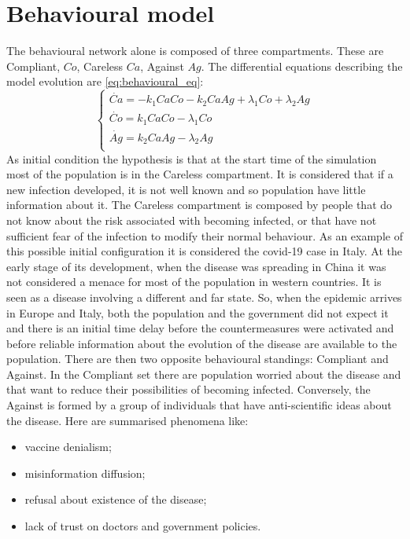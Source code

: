 \section{Behavioural model}
The behavioural network alone is composed of three compartments.
These are Compliant, $Co$, Careless $Ca$, Against $Ag$. 
The differential equations describing the model evolution are \ref{eq:behavioural_eq}: 
\begin{equation}
	\begin{cases}
		\dot{Ca} = -k_1 Ca Co - k_2 Ca Ag + \lambda_1 Co + \lambda_2 Ag \\
		\dot{Co} = k_1 Ca Co -  \lambda_1 Co \\
		\dot{Ag} = k_2 Ca Ag -  \lambda_2 Ag\\
	\end{cases}
	\label{eq:behavioural_eq}
\end{equation}
As initial condition the hypothesis is that at the start time of the simulation most of the population is in the Careless compartment. It is considered that if a new infection developed, it is not well known and so population have little information about it. The Careless compartment is composed by people that do not know about the risk associated with becoming infected, or that have not sufficient fear of the infection to modify their normal behaviour. 
As an example of this possible initial configuration it is considered the covid-19 case in Italy. At the early stage of its development, when the disease was spreading in China it was not considered a menace for most of the population in western countries. It is seen as a disease involving a different and far state. So, when the epidemic arrives in Europe and Italy, both the population and the government did not expect it and there is an initial time delay before the countermeasures were activated and before reliable information about the evolution of the disease are available to the population. 
There are then two opposite behavioural standings: Compliant and Against.
In the Compliant set there are population worried about the disease and that want to reduce their possibilities of becoming infected. Conversely, the Against is formed by a group of individuals that have anti-scientific ideas about the disease. Here are summarised phenomena like:
\begin{itemize}
		\item vaccine denialism;
		\item misinformation diffusion;
		\item refusal about existence of the disease;
		\item lack of trust on doctors and government policies.
\end{itemize}

